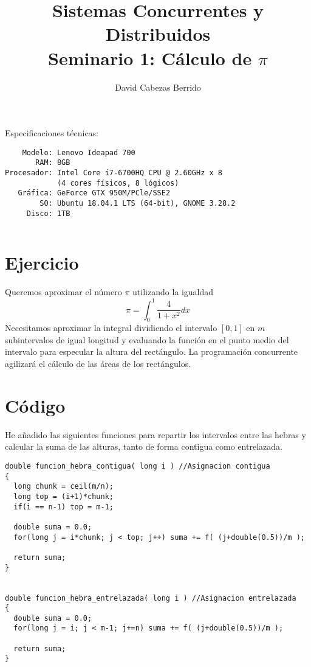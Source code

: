 \documentclass[12pt,spanish]{article}
\begin{document}
\title{Sistemas Concurrentes y Distribuidos \\ Seminario 1: Cálculo de
  $\pi$}
\author{David Cabezas Berrido}
\date{\vspace{-5mm}}
\maketitle
\tableofcontents
\vfill
\begin{flushleft}
  {\Large Especificaciones técnicas:}
\begin{verbatim}
    Modelo: Lenovo Ideapad 700
       RAM: 8GB 
Procesador: Intel Core i7-6700HQ CPU @ 2.60GHz x 8
            (4 cores físicos, 8 lógicos)
   Gráfica: GeForce GTX 950M/PCle/SSE2
        SO: Ubuntu 18.04.1 LTS (64-bit), GNOME 3.28.2
     Disco: 1TB
\end{verbatim}
\end{flushleft}

\begin{verbatim}

\end{verbatim}
\newpage

\section{Ejercicio}
Queremos aproximar el número $\pi$ utilizando la igualdad
\[\pi = \int_0^1\frac{4}{1+x^2}dx\]
Necesitamos aproximar la integral dividiendo el intervalo $[0,1]$ en
$m$ subintervalos de igual longitud y evaluando la función en el punto
medio del intervalo para especular la altura del rectángulo. La
programación concurrente agilizará el cálculo de las áreas de los
rectángulos.

\section{Código}
He añadido las siguientes funciones para repartir los intervalos entre
las hebras y calcular la suma de las alturas, tanto de forma contigua
como entrelazada.

\begin{lstlisting}
double funcion_hebra_contigua( long i ) //Asignacion contigua
{
  long chunk = ceil(m/n);
  long top = (i+1)*chunk;
  if(i == n-1) top = m-1;
  
  double suma = 0.0;
  for(long j = i*chunk; j < top; j++) suma += f( (j+double(0.5))/m );
  
  return suma;
}


double funcion_hebra_entrelazada( long i ) //Asignacion entrelazada
{
  double suma = 0.0;
  for(long j = i; j < m-1; j+=n) suma += f( (j+double(0.5))/m );

  return suma;
}
\end{lstlisting}
\end{document}
